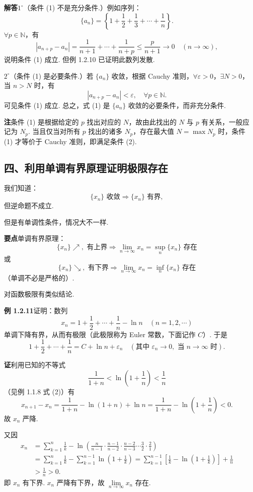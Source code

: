 \documentclass[UTF8, 12pt, fontset=fandol, oneside]{ctexart}
\begin{document}
\noindent\textbf{解答}\quad $1^\circ$（条件 (1) 不是充分条件.）例如序列：
\[
  \{a_n\}=\left\{1+\frac12+\frac13+\cdots+\frac1n\right\}.
\]
$\forall p\in\mathbb{N}$，有
\[
  |a_{n+p}-a_n|=\frac1{n+1}+\cdots+\frac1{n+p}\le \frac{p}{n+1}\to0\quad(n\to\infty),
\]
说明条件 (1) 成立. 但例 1.2.10 已证明此数列发散.

$2^\circ$（条件 (1) 是必要条件.）若 $\{a_n\}$ 收敛，根据 Cauchy 准则，$\forall\varepsilon>0$，$\exists N>0$，当 $n>N$ 时，有
\[
  |a_{n+p}-a_n|<\varepsilon,\quad \forall p\in\mathbb{N}.
\tag{2}
\]
可见条件 (1) 成立. 总之，式 (1) 是 $\{a_n\}$ 收敛的必要条件，而非充分条件.

\noindent\textbf{注}\quad 条件 (1) 是根据给定的 $p$ 找出对应的 $N$，故由此找出的 $N$ 与 $p$ 有关系，一般应记为 $N_p$. 当且仅当对所有 $p$ 找出的诸多 $N_p$，存在最大值 $N=\max N_p$ 时，条件 (1) 才等价于 Cauchy 准则，即满足条件 (2).

\subsection*{四、利用单调有界原理证明极限存在}

我们知道：
\[
  \{x_n\}\text{ 收敛}\Rightarrow \{x_n\}\text{ 有界},
\]
但逆命题不成立.

但是有单调性条件，情况大不一样.

\noindent\textbf{要点}\quad 单调有界原理：
\[
  \{x_n\}\nearrow,\text{ 有上界}\Rightarrow \lim_{n\to\infty}x_n=\sup_n\{x_n\}\text{ 存在}
\]
或
\[
  \{x_n\}\searrow,\text{ 有下界}\Rightarrow \lim_{n\to\infty}x_n=\inf_n\{x_n\}\text{ 存在}
\]
（单调不必是严格的）.

对函数极限有类似结论.

\noindent\textbf{例 1.2.11}\quad 证明：数列
\[
  x_n=1+\frac12+\cdots+\frac1n-\ln n\quad(n=1,2,\cdots)
\]
单调下降有界，从而有极限（此极限称为 Euler 常数，下面记作 $C$）. 于是
\[
  1+\frac12+\cdots+\frac1n=C+\ln n+\varepsilon_n
  \quad(\text{其中 }\varepsilon_n\to0,\text{ 当 }n\to\infty\text{ 时}).
\]

\noindent\textbf{证}\quad 利用已知的不等式
\[
  \frac1{1+n}<\ln\left(1+\frac1n\right)<\frac1n
\]
（见例 1.1.8 式 (2)）有
\[
  x_{n+1}-x_n=\frac1{1+n}-\ln(1+n)+\ln n
  =\frac1{1+n}-\ln\left(1+\frac1n\right)<0.
\]
故 $x_n$ 严降.

又因
\[
\begin{aligned}
x_n&=\sum_{k=1}^n\frac1k-\ln\left(\frac n{n-1}\cdot\frac{n-1}{n-2}\cdot\frac{n-2}{n-3}\cdots\frac32\cdot\frac21\right)\\
&=\sum_{k=1}^n\frac1k-\sum_{k=1}^{n-1}\ln\left(1+\frac1k\right)
=\sum_{k=1}^{n-1}\left[\frac1k-\ln\left(1+\frac1k\right)\right]+\frac1n\\
&>\frac1n>0.
\end{aligned}
\]
即 $x_n$ 有下界. $x_n$ 严降有下界，故 $\lim\limits_{n\to\infty}x_n$ 存在.
\end{document}
